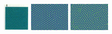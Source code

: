 \begin{itemize}
\includegraphics[height=1.4cm]{python_codes/fieldstone_171/images/pear93_delta}
\includegraphics[height=1.4cm]{python_codes/fieldstone_171/images/munafo_delta1}
\includegraphics[height=1.4cm]{python_codes/fieldstone_171/images/munafo_delta2}


\end{itemize}
